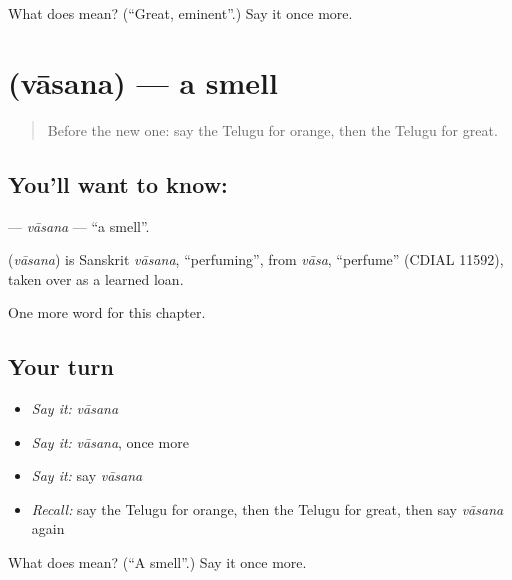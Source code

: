 \begin{tcolorbox}[breakable,colback=teal!4,colframe=teal!35!black,title={Before you move on}]
What does  mean? (\textquotedblleft{}Great, eminent\textquotedblright{}.) Say it once more.
\end{tcolorbox}
\section[\texorpdfstring{\te{వాసన} (vāsana)}{వాసన (vāsana)}]{ (vāsana) — a smell}

\label{lesson:TE-C181-vasana}



\begin{quote}
Before the new one: say the Telugu for orange, then the Telugu for great.
\end{quote}

\subsection*{You'll want to know: }
\textbf{} — \emph{vāsana} — \textquotedblleft{}a smell\textquotedblright{}.

\begin{cousinweb}
\textbf{} (\emph{vāsana}) is Sanskrit \emph{vāsana}, \textquotedblleft{}perfuming\textquotedblright{}, from \emph{vāsa}, \textquotedblleft{}perfume\textquotedblright{} (CDIAL 11592), taken over as a learned loan.
\end{cousinweb}

\begin{grammarlens}[title={What you've built}]
One more word for this chapter.
\end{grammarlens}

\subsection*{Your turn}
\begin{itemize}
\raggedright
  \item \emph{Say it:} \emph{vāsana}
  \item \emph{Say it:} \emph{vāsana}, once more
  \item \emph{Say it:} say \emph{vāsana}
  \item \emph{Recall:} say the Telugu for orange, then the Telugu for great, then say \emph{vāsana} again
\end{itemize}

\begin{tcolorbox}[breakable,colback=teal!4,colframe=teal!35!black,title={Before you move on}]
What does  mean? (\textquotedblleft{}A smell\textquotedblright{}.) Say it once more.
\end{tcolorbox}
